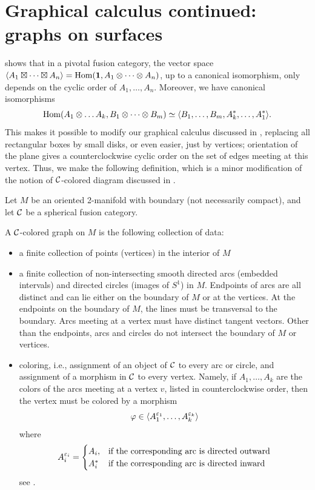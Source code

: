 \section{Graphical calculus continued: graphs on surfaces}\label{s:graphical2}

 shows that in a pivotal fusion category, the vector
space $\langle A_1\boxtimes\dots\boxtimes A_n\rangle=\operatorname{Hom}(\mathbf{1}, A_1\otimes\dots\otimes
A_n)$, up to a canonical isomorphism, only depends on the cyclic order of $A_1,
\dots, A_n$. Moreover, we have canonical isomorphisms
$$
   \operatorname{Hom}(A_1\otimes \dots A_k, B_1\otimes\dots\otimes B_m)\simeq
   \langle B_1, \dots, B_m,
  A_k^*,\dots, A_1^*\rangle.
$$
This makes it possible to modify our graphical calculus discussed in
, replacing all rectangular boxes by small disks, or even
easier, just by vertices; orientation of the plane gives a counterclockwise
cyclic order on the set of edges meeting at this vertex. Thus, we make the
following definition, which is a minor modification of the notion of
$\mathcal{C}$-colored diagram discussed in .
\begin{definition}\label{d:colored-graph}
  Let $M$ be an oriented 2-manifold with boundary (not necessarily compact), and
  let $\mathcal{C}$ be a spherical fusion category.

  A $\mathcal{C}$-colored graph on $M$ is the following collection of data:
  \begin{itemize}
    \item a finite collection of points (vertices) in the interior of $M$

    \item a finite collection of non-intersecting smooth directed arcs (embedded
    intervals) and directed circles (images of $S^1$) in $M$. Endpoints of arcs
    are all distinct and can lie either on the boundary of $M$ or at the
    vertices. At the endpoints on the boundary of $M$, the lines must be
    transversal to the boundary. Arcs meeting at a vertex must have distinct
    tangent vectors. Other than the endpoints, arcs and circles do not intersect
    the boundary of $M$ or vertices.

    \item coloring, i.e., assignment of an object of $\mathcal{C}$ to every arc or
    circle, and assignment of a morphism in $\mathcal{C}$ to every vertex. Namely, if
    $A_1, \dots, A_k$ are the colors of the arcs meeting at a vertex $v$, listed
    in counterclockwise order, then the vertex must be colored by a morphism
    $$
      \varphi\in \langle
        A_1^{\varepsilon_1},\dots, A_k^{\varepsilon_k}\rangle
    $$
    where
    \begin{equation}\label{e:signed-object2}
      A_i^{\varepsilon_i} =\begin{cases}
                   A_i, & \text{if the corresponding arc is directed outward}\\
                   A_i^* &\text{if the corresponding arc is directed inward}
                   \end{cases}
    \end{equation}
    see .
  \end{itemize}


\end{definition}

